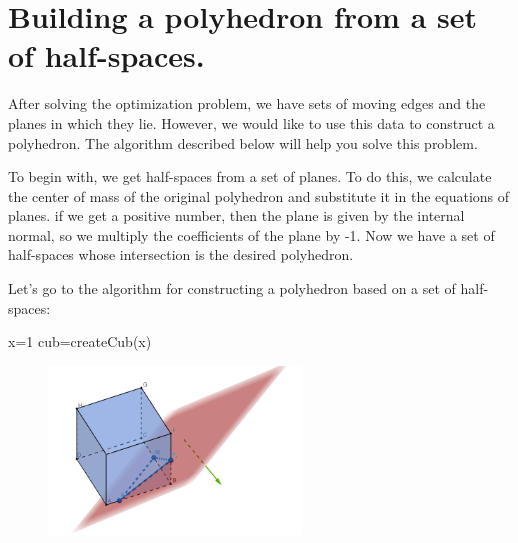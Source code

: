 \documentclass[11pt,fleqn,a4paper]{scrartcl}
\begin{document}
\section{Building a polyhedron from a set of half-spaces.}
After solving the optimization problem, we have sets of moving edges and the planes in which they lie. However, we would like to use this data to construct a polyhedron. The algorithm described below will help you solve this problem.
\par
To begin with, we get half-spaces from a set of planes. To do this, we calculate the center of mass of the original polyhedron and substitute it in the equations of planes. if we get a positive number, then the plane is given by the internal normal, so we multiply the coefficients of the plane by -1. Now we have a set of half-spaces whose intersection is the desired polyhedron.
\par
Let's go to the algorithm for constructing a polyhedron based on a set of half-spaces:
\begin{algorithm}[H]

x=1\;
cub=createCub(x)\;

\end{algorithm}
\begin{figure}

\includegraphics[width=0.6\textwidth]{cub3.png}
\end{figure}
\end{document}
